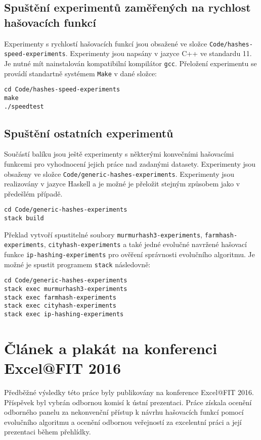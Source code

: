 \section{Spuštění experimentů zaměřených na rychlost hašovacích funkcí}
Experimenty s rychlostí hašovacích funkcí jsou obsažené ve složce \texttt{Code/hashes-speed-experiments}. Experimenty jsou napsány v jazyce C++ 
ve standardu 11. Je nutné mít nainstalován kompatibilní kompilátor \texttt{gcc}. Přeložení experimentu se provádí standartně systémem \texttt{Make} v
dané složce:
\begin{verbatim}
cd Code/hashes-speed-experiments
make
./speedtest
\end{verbatim}

\section{Spuštění ostatních experimentů}
Součástí balíku jsou ještě experimenty s některými konvečními hašovacími funkcemi pro vyhodnocení jejich práce nad zadanými datasety. Experimenty
jsou obsaženy ve složce \texttt{Code/generic-hashes-experiments}. Experimenty jsou realizovány v jazyce Haskell a je možné je přeložit stejným způsobem
jako v předešlém případě. 
\begin{verbatim}
cd Code/generic-hashes-experiments
stack build
\end{verbatim}
Překlad vytvoří spustitelné soubory \texttt{murmurhash3-experiments}, \texttt{farmhash-experiments}, \texttt{cityhash-experiments} a také jedné evolučné
navržené hašovací funkce \texttt{ip-hashing-experiments} pro ověření správnosti evolučního algoritmu. Je možné je spustit programem \texttt{stack} následovně:
\begin{verbatim}
cd Code/generic-hashes-experiments
stack exec murmurhash3-experiments
stack exec farmhash-experiments
stack exec cityhash-experiments
stack exec ip-hashing-experiments
\end{verbatim}

\chapter{Článek a plakát na konferenci Excel@FIT 2016}
Předběžné výsledky této práce byly publikovány na konference Excel@FIT 2016. Příspěvek byl vybrán
odbornou komisí k ústní prezentaci. Práce získala ocenění odborného panelu za nekonvenční přístup k návrhu hašovacích
funkcí pomocí evolučního algoritmu a ocenění odbornou veřejností za excelentní práci a její prezentaci během přehlídky.

